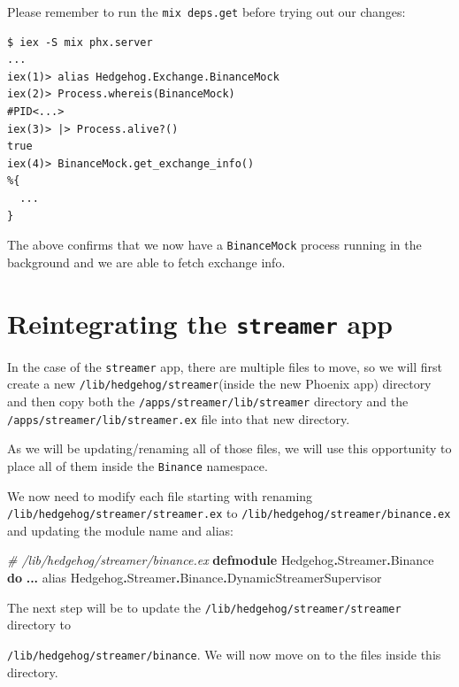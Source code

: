 \documentclass[
  oneside]{book}
\newenvironment{Shaded}{\begin{snugshade}}{\end{snugshade}}
\newcommand{\CommentTok}[1]{\textcolor[rgb]{0.56,0.35,0.01}{\textit{#1}}}
\newcommand{\ConstantTok}[1]{\textcolor[rgb]{0.56,0.35,0.01}{#1}}
\newcommand{\ImportTok}[1]{#1}
\newcommand{\KeywordTok}[1]{\textcolor[rgb]{0.13,0.29,0.53}{\textbf{#1}}}
\newcommand{\OperatorTok}[1]{\textcolor[rgb]{0.81,0.36,0.00}{\textbf{#1}}}
\begin{document}
Please remember to run the \texttt{mix\ deps.get} before trying out our changes:

\begin{verbatim}
$ iex -S mix phx.server
...
iex(1)> alias Hedgehog.Exchange.BinanceMock
iex(2)> Process.whereis(BinanceMock)
#PID<...>
iex(3)> |> Process.alive?()
true
iex(4)> BinanceMock.get_exchange_info()
%{
  ...
}
\end{verbatim}

The above confirms that we now have a \texttt{BinanceMock} process running in the background and we are able to fetch exchange info.

\section{\texorpdfstring{Reintegrating the \texttt{streamer} app}{Reintegrating the streamer app}}\label{reintegrating-the-streamer-app}

In the case of the \texttt{streamer} app, there are multiple files to move, so we will first create a new \texttt{/lib/hedgehog/streamer}(inside the new Phoenix app) directory and then copy both the \texttt{/apps/streamer/lib/streamer} directory and the \texttt{/apps/streamer/lib/streamer.ex} file into that new directory.

As we will be updating/renaming all of those files, we will use this opportunity to place all of them inside the \texttt{Binance} namespace.

We now need to modify each file starting with renaming \texttt{/lib/hedgehog/streamer/streamer.ex} to \texttt{/lib/hedgehog/streamer/binance.ex} and updating the module name and alias:

\begin{Shaded}
\begin{Highlighting}[]
\CommentTok{\# /lib/hedgehog/streamer/binance.ex}
\KeywordTok{defmodule} \ConstantTok{Hedgehog}\OperatorTok{.}\ConstantTok{Streamer}\OperatorTok{.}\ConstantTok{Binance} \KeywordTok{do}
  \OperatorTok{...}
  \ImportTok{alias} \ConstantTok{Hedgehog}\OperatorTok{.}\ConstantTok{Streamer}\OperatorTok{.}\ConstantTok{Binance}\OperatorTok{.}\ConstantTok{DynamicStreamerSupervisor}
\end{Highlighting}
\end{Shaded}

The next step will be to update the \texttt{/lib/hedgehog/streamer/streamer} directory to

\texttt{/lib/hedgehog/streamer/binance}. We will now move on to the files inside this directory.
\end{document}
